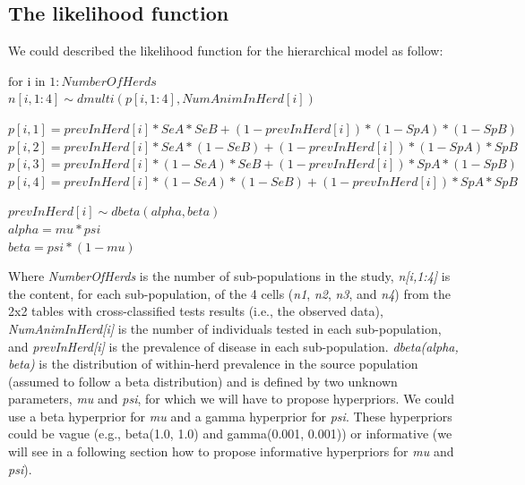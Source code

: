 \documentclass[
]{book}
\begin{document}
\subsection{The likelihood function}\label{the-likelihood-function-1}

We could described the likelihood function for the hierarchical model as follow:

\(\text{for i in  }1:NumberOfHerds\)\\
\(n[i,1:4] \sim dmulti(p[i,1:4], NumAnimInHerd[i])\)

\(p[i,1] = prevInHerd[i]*SeA*SeB + (1-prevInHerd[i])*(1-SpA)*(1-SpB)\)\\
\(p[i,2] = prevInHerd[i]*SeA*(1-SeB) + (1-prevInHerd[i])*(1-SpA)*SpB\)\\
\(p[i,3] = prevInHerd[i]*(1-SeA)*SeB + (1-prevInHerd[i])*SpA*(1-SpB)\)\\
\(p[i,4] = prevInHerd[i]*(1-SeA)*(1-SeB) + (1-prevInHerd[i])*SpA*SpB\)

\(prevInHerd[i] \sim dbeta(alpha, beta)\)\\
\(alpha = mu*psi\)\\
\(beta = psi*(1-mu)\)

Where \emph{NumberOfHerds} is the number of sub-populations in the study, \emph{n{[}i,1:4{]}} is the content, for each sub-population, of the 4 cells (\emph{n1}, \emph{n2}, \emph{n3}, and \emph{n4}) from the 2x2 tables with cross-classified tests results (i.e., the observed data), \emph{NumAnimInHerd{[}i{]}} is the number of individuals tested in each sub-population, and \emph{prevInHerd{[}i{]}} is the prevalence of disease in each sub-population. \emph{dbeta(alpha, beta)} is the distribution of within-herd prevalence in the source population (assumed to follow a beta distribution) and is defined by two unknown parameters, \emph{mu} and \emph{psi}, for which we will have to propose hyperpriors. We could use a beta hyperprior for \emph{mu} and a gamma hyperprior for \emph{psi}. These hyperpriors could be vague (e.g., beta(1.0, 1.0) and gamma(0.001, 0.001)) or informative (we will see in a following section how to propose informative hyperpriors for \emph{mu} and \emph{psi}).
\end{document}
